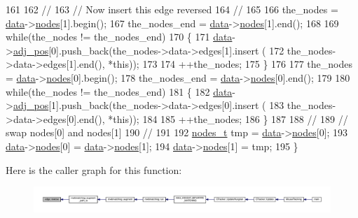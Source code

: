 \begin{DoxyCode}
161 
162     \textcolor{comment}{//}
163     \textcolor{comment}{// Now insert this edge reversed}
164     \textcolor{comment}{//}
165 
166     the\_nodes = \mbox{\hyperlink{classedge_a0ebb6dfa28b77f47529085049352b436}{data}}->\mbox{\hyperlink{classedge__data_a870bbbb05de6c5f63d434db624c55dd4}{nodes}}[1].begin();
167     the\_nodes\_end = \mbox{\hyperlink{classedge_a0ebb6dfa28b77f47529085049352b436}{data}}->\mbox{\hyperlink{classedge__data_a870bbbb05de6c5f63d434db624c55dd4}{nodes}}[1].end();
168 
169     \textcolor{keywordflow}{while}(the\_nodes != the\_nodes\_end)
170     \{
171     \mbox{\hyperlink{classedge_a0ebb6dfa28b77f47529085049352b436}{data}}->\mbox{\hyperlink{classedge__data_aa325caa449576727df8042bad875bf43}{adj\_pos}}[0].push\_back(the\_nodes->data->edges[1].insert (
172         the\_nodes->data->edges[1].end(), *\textcolor{keyword}{this}));
173 
174     ++the\_nodes;
175     \}
176 
177     the\_nodes = \mbox{\hyperlink{classedge_a0ebb6dfa28b77f47529085049352b436}{data}}->\mbox{\hyperlink{classedge__data_a870bbbb05de6c5f63d434db624c55dd4}{nodes}}[0].begin();
178     the\_nodes\_end = \mbox{\hyperlink{classedge_a0ebb6dfa28b77f47529085049352b436}{data}}->\mbox{\hyperlink{classedge__data_a870bbbb05de6c5f63d434db624c55dd4}{nodes}}[0].end();
179 
180     \textcolor{keywordflow}{while}(the\_nodes != the\_nodes\_end)
181     \{
182     \mbox{\hyperlink{classedge_a0ebb6dfa28b77f47529085049352b436}{data}}->\mbox{\hyperlink{classedge__data_aa325caa449576727df8042bad875bf43}{adj\_pos}}[1].push\_back(the\_nodes->data->edges[0].insert (
183         the\_nodes->data->edges[0].end(), *\textcolor{keyword}{this}));
184 
185     ++the\_nodes;
186     \}
187 
188     \textcolor{comment}{//}
189     \textcolor{comment}{// swap nodes[0] and nodes[1]}
190     \textcolor{comment}{// }
191     
192     \mbox{\hyperlink{edge_8h_a22ac17689106ba21a84e7bc54d1199d6}{nodes\_t}} tmp = \mbox{\hyperlink{classedge_a0ebb6dfa28b77f47529085049352b436}{data}}->\mbox{\hyperlink{classedge__data_a870bbbb05de6c5f63d434db624c55dd4}{nodes}}[0];
193     \mbox{\hyperlink{classedge_a0ebb6dfa28b77f47529085049352b436}{data}}->\mbox{\hyperlink{classedge__data_a870bbbb05de6c5f63d434db624c55dd4}{nodes}}[0] = \mbox{\hyperlink{classedge_a0ebb6dfa28b77f47529085049352b436}{data}}->\mbox{\hyperlink{classedge__data_a870bbbb05de6c5f63d434db624c55dd4}{nodes}}[1];
194     \mbox{\hyperlink{classedge_a0ebb6dfa28b77f47529085049352b436}{data}}->\mbox{\hyperlink{classedge__data_a870bbbb05de6c5f63d434db624c55dd4}{nodes}}[1] = tmp;
195 \}
\end{DoxyCode}
Here is the caller graph for this function\+:\nopagebreak
\begin{figure}[H]
\begin{center}
\leavevmode
\includegraphics[width=350pt]{classedge_ad62516eb40dbee9f57a2078cfd97b4c9_icgraph}
\end{center}
\end{figure}
\mbox{\label{classedge_ae82d5701f7e6f71edc3c8b0e34bcd2b7}} 
